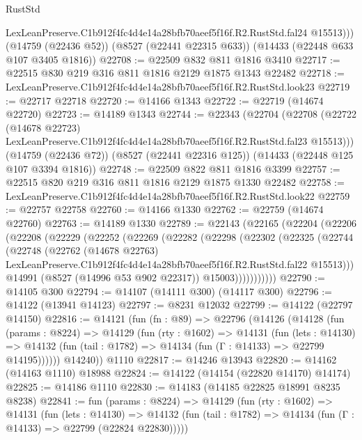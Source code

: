 \begin{lexlean}{RustStd}
\begin{coremodule}
          LexLeanPreserve.C1b912f4fc4d4e14a28bfb70aeef5f16f.R2.RustStd.fal24
          @15513)))
    (@14759 (@22436 @52))
    (@8527 (@22441 @22315 @633))
    (@14433 (@22448 @633 @107 @3405 @1816))
@22708 := @22509 @832 @811 @1816 @3410
@22717 := @22515 @830 @219 @316 @811 @1816 @2129 @1875 @1343 @22482
@22718 := LexLeanPreserve.C1b912f4fc4d4e14a28bfb70aeef5f16f.R2.RustStd.look23
@22719 := @22717 @22718
@22720 := @14166 @1343
@22722 := @22719 (@14674 @22720)
@22723 := @14189 @1343
@22744 := @22343
    (@22704
      (@22708
        (@22722
          (@14678 @22723)
          LexLeanPreserve.C1b912f4fc4d4e14a28bfb70aeef5f16f.R2.RustStd.fal23
          @15513)))
    (@14759 (@22436 @72))
    (@8527 (@22441 @22316 @125))
    (@14433 (@22448 @125 @107 @3394 @1816))
@22748 := @22509 @822 @811 @1816 @3399
@22757 := @22515 @820 @219 @316 @811 @1816 @2129 @1875 @1330 @22482
@22758 := LexLeanPreserve.C1b912f4fc4d4e14a28bfb70aeef5f16f.R2.RustStd.look22
@22759 := @22757 @22758
@22760 := @14166 @1330
@22762 := @22759 (@14674 @22760)
@22763 := @14189 @1330
@22789 := @22143
    (@22165
      (@22204
        (@22206
          (@22208
            (@22229
              (@22252
                (@22269
                  (@22282
                    (@22298
                      (@22302
                        (@22325
                          (@22744
                            (@22748
                              (@22762
                                (@14678 @22763)
                                LexLeanPreserve.C1b912f4fc4d4e14a28bfb70aeef5f16f.R2.RustStd.fal22
                                @15513)))
                          @14991
                          (@8527 (@14996 @53 @902 @22317))
                          @15003)))))))))))
@22790 := @14105 @300
@22794 := @14107 (@14111 @300) (@14117 @300)
@22796 := @14122 (@13941 @14123)
@22797 := @8231 @12032
@22799 := @14122 (@22797 @14150)
@22816 := @14121
    (fun (fn : @89) =>
    @22796
      (@14126
        (@14128
          (fun (params : @8224) =>
          @14129
            (fun (rty : @1602) =>
            @14131
              (fun (lets : @14130) =>
              @14132 (fun (tail : @1782) => @14134 (fun (Γ : @14133) => @22799 @14195))))))
        @14240))
    @1110
@22817 := @14246 @13943
@22820 := @14162 (@14163 @1110) @18988
@22824 := @14122 (@14154 (@22820 @14170) @14174)
@22825 := @14186 @1110
@22830 := @14183 (@14185 @22825 @18991 @8235 @8238)
@22841 := fun (params : @8224) =>
  @14129
    (fun (rty : @1602) =>
    @14131
      (fun (lets : @14130) =>
      @14132 (fun (tail : @1782) => @14134 (fun (Γ : @14133) => @22799 (@22824 @22830)))))

\end{coremodule}
\end{lexlean}
